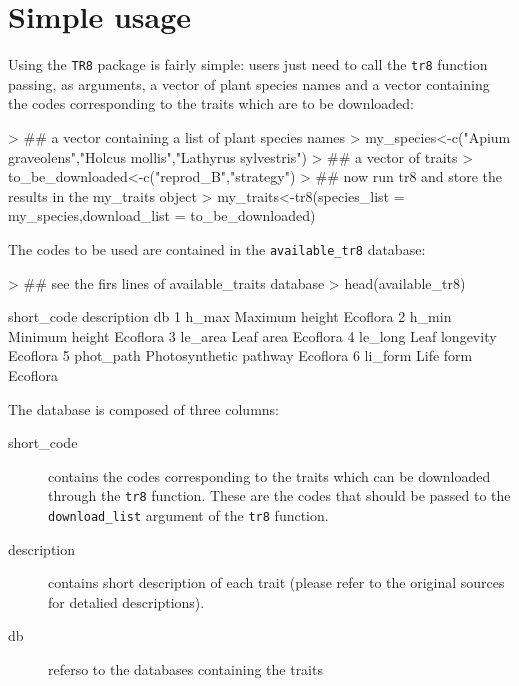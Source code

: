 \documentclass{article}
\begin{document}
 
\section{Simple usage}
\label{sec:usage}

  Using the \texttt{TR8} package is fairly simple: users just need to
  call the \texttt{tr8} function passing, as arguments, a vector of
  plant species names and a vector containing the codes corresponding
  to the traits which are to be downloaded:
  
\begin{Schunk}
\begin{Sinput}
> ## a vector containing a list of plant species names
> my_species<-c("Apium graveolens","Holcus mollis","Lathyrus sylvestris")
> ## a vector of traits
> to_be_downloaded<-c("reprod_B","strategy")
> ## now run tr8 and store the results in the my_traits object
> my_traits<-tr8(species_list = my_species,download_list = to_be_downloaded)
\end{Sinput}
\end{Schunk}

  The codes to be used are contained in the \texttt{available\_tr8} database:

\begin{Schunk}
\begin{Sinput}
> ## see the firs lines of available_traits database
> head(available_tr8)
\end{Sinput}
\begin{Soutput}
  short_code            description       db
1      h_max         Maximum height Ecoflora
2      h_min         Minimum height Ecoflora
3    le_area              Leaf area Ecoflora
4    le_long         Leaf longevity Ecoflora
5  phot_path Photosynthetic pathway Ecoflora
6    li_form              Life form Ecoflora
\end{Soutput}
\end{Schunk}

 The database is composed of three columns:
 \begin{description}
 \item[short\_code] contains the codes corresponding to the traits which can be downloaded through the \texttt{tr8} function.
   These are the codes that should be passed to the \texttt{download\_list} argument of the \texttt{tr8} function.
 \item[description] contains short description of each trait (please refer to the original sources for detalied descriptions).
 \item[db] referso to the databases containing the traits
 \end{description}
\end{document}
